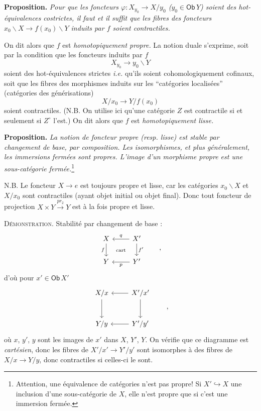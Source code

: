 \documentclass[11pt]{article}
\newcommand{\printedpage}[1]{\marginpar{\footnotesize p.~#1}}
\newcommand{\msp}[1]{\marginpar{\footnotesize [#1]}}
\newcommand{\Ob}{\mathsf{Ob}}
\begin{document}
\noindent\textbf{Proposition.} \textit{Pour que les foncteurs $\varphi : X_{y_0} \to X/y_0$ ($y_0 \in \Ob\, Y$) soient des hot-équivalences costrictes, il faut et il suffit que les fibres des foncteurs $x_0\backslash X \to f(x_0)\backslash Y$ induits par $f$ soient contractiles.}

\noindent\msp{page 54}
On dit alors que $f$ est \textit{homotopiquement propre.} La notion duale s'exprime, soit par la condition que les foncteurs induits par $f$
\[
X_{y_0} \longrightarrow y_0\backslash Y
\]
soient des hot-équivalences strictes \textit{i.e.} qu'ils soient cohomologiquement cofinaux, soit que les fibres des morphismes induits sur les ``catégories localisées'' (catégories des générisations)
\[
X/x_0 \longrightarrow Y/f(x_0)
\]
soient contractiles. (N.B. On utilise ici qu'une catégorie $Z$ est contractile si et seulement si $Z^\circ$ l'est.) On dit alors que $f$ est \textit{homotopiquement lisse.}

\noindent\textbf{Proposition.} \textit{La notion de foncteur propre (resp. lisse) est stable par changement de base, par composition. Les isomorphismes, et plus généralement, les immersions fermées sont propres. L'image d'un morphisme propre est une sous-catégorie fermée.}\footnote[23]{Attention, une équivalence de catégories n'est pas propre! Si $X' \hookrightarrow X$ une inclusion d'une sous-catégorie de $X$, elle n'est propre que si c'est une immersion fermée.}

\noindent N.B. Le foncteur $X \to e$ est toujours propre et lisse, car les catégories $x_0\backslash X$ et $X/x_0$ sont contractiles (ayant objet initial ou objet final). Donc tout foncteur de projection $X \times Y \xrightarrow{pr_2} Y$ est à la fois propre et lisse.

\printedpage{31}

\noindent\msp{page 55}
\textsc{Démonstration}. Stabilité par changement de base :
\[
\begin{tikzcd}
X \arrow[d, "f"'] \arrow[dr, phantom, "\text{\scriptsize cart}"] & X' \arrow[l, "q"'] \arrow[d, "f'"] \\
Y & Y' \arrow[l, "p"]
\end{tikzcd}
\qquad ,
\]
d'où pour $x' \in \Ob\, X'$
\[
\begin{tikzcd}[row sep=large]
X/x \arrow[d] & X'/x' \arrow[l] \arrow[d] \\
Y/y & Y'/y' \arrow[l]
\end{tikzcd}
\qquad ,
\]
où $x$, $y'$, $y$ sont les images de $x'$ dans $X$, $Y'$, $Y$. On vérifie que ce diagramme est \textit{cartésien}, donc les fibres de $X'/x' \longrightarrow Y'/y'$ sont isomorphes à des fibres de $X/x \longrightarrow Y/y$, donc contractiles si celles-ci le sont.
\end{document}
